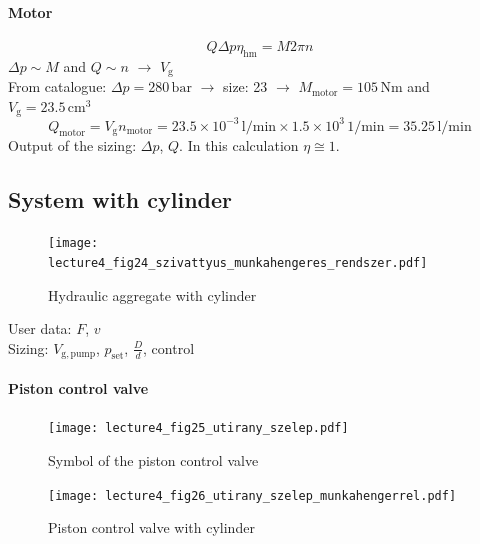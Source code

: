 \paragraph{Motor}
\begin{equation}
Q\Delta p \eta_{\mathrm{hm}}=M2\pi n
\end{equation}
$\Delta p \sim M$ and $Q \sim n$ $\rightarrow $ $V_{\mathrm{g}}$\\
From catalogue: $\Delta p=280\,\mathrm{bar}$ $\rightarrow$ size: 23 $\rightarrow$ $M_{\mathrm{motor}}=105\,\mathrm{Nm}$ and $V_{\mathrm{g}}=23.5\,\mathrm{cm^3}$
\begin{equation}
Q_{\mathrm{motor}}=V_{\mathrm{g}}n_{\mathrm{motor}}=23.5\times 10^{-3}\,\mathrm{l/min}\times 1.5\times 10^{3}\,\mathrm{1/min}=35.25\,\mathrm{l/min}
\end{equation}
Output of the sizing: $\Delta p$, $Q$. In this calculation $\eta \cong 1$.
\subsection{System with cylinder}

\begin{figure}[tbh]
\begin{center}
\texttt{[image: lecture4\_fig24\_szivattyus\_munkahengeres\_rendszer.pdf]}
\caption{\label{fig:hydraulic_aggregate_with_cylinder}Hydraulic aggregate with cylinder}
\end{center}
\end{figure}
User data: $F$, $v$\\
Sizing: $V_{\mathrm{g,pump}}$, $p_{\mathrm{set}}$, $\frac{D}{d}$, control
\paragraph{Piston control valve}

\begin{figure}[tbh]
\begin{center}
\texttt{[image: lecture4\_fig25\_utirany\_szelep.pdf]}
\caption{\label{fig:piston_control_valve}Symbol of the piston control valve}
\end{center}
\end{figure}
\begin{figure}[tbh]
\begin{center}
\texttt{[image: lecture4\_fig26\_utirany\_szelep\_munkahengerrel.pdf]}
\caption{\label{fig:piston_control_valve_with_cylinder}Piston control valve with cylinder}
\end{center}
\end{figure}

